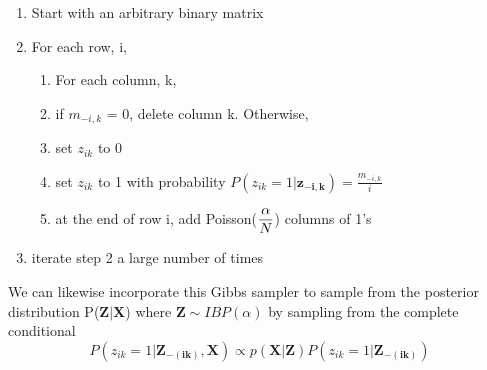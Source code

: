 \begin{enumerate}
  \item Start with an arbitrary binary matrix
  \item For each row, i,
  \begin{enumerate}
    \item For each column, k,
    \item if $m_{-i,k}$ = 0, delete column k. Otherwise,
    \item set $z_{ik}$ to 0
    \item set $z_{ik}$ to 1 with probability $P(z_{ik}=1|\bm{z_{-i,k}}) = \frac{m_{-i,k}}{i}$
    \item at the end of row i, add Poisson($\displaystyle\frac{\alpha}{N}$) columns of 1's
  \end{enumerate}
  \item iterate step 2 a large number of times
\end{enumerate}
We can likewise incorporate this Gibbs sampler to sample from the posterior distribution P($\bm{Z|X}$)
where $\bm Z \sim IBP(\alpha)$ by sampling from the complete conditional
\[
  P(z_{ik}=1|\bm{Z_{-(ik)},X})  \propto p(\bm{X|Z}) P(z_{ik}=1|\bm{Z_{-(ik)}})
\]


